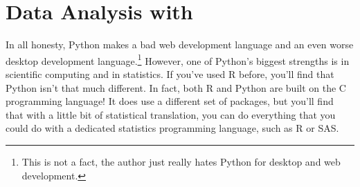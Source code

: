 \chapter{Data Analysis with }
In all honesty, Python makes a bad web development language and an even worse desktop development language.\footnote{This is not a fact, the author just really hates Python for desktop and web development.} However, one of Python's biggest strengths is in scientific computing and in statistics. If you've used R before, you'll find that Python isn't that much different. In fact, both R and Python are built on the C programming language! It does use a different set of packages, but you'll find that with a little bit of statistical translation, you can do everything that you could do with a dedicated statistics programming language, such as R or SAS.\par

